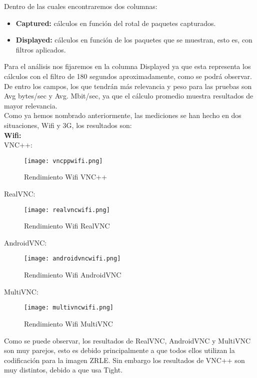 Dentro de las cuales encontraremos dos columnas:
\begin{itemize}
\item \textbf{Captured:} cálculos en función del rotal de paquetes capturados.
\item \textbf{Displayed:} cálculos en función de los paquetes que se muestran, esto es, con filtros aplicados.
\end{itemize}

Para el análisis nos fijaremos en la columna Displayed ya que esta representa los cálculos con el filtro de 180 segundos aproximadamente, como se podrá observar. De entro los campos, los que tendrán más relevancia y peso para las pruebas son Avg bytes/sec y Avg. Mbit/sec, ya que el cálculo promedio muestra resultados de mayor relevancia.\\
\newpage
Como ya hemos nombrado anteriormente, las mediciones se han hecho en dos situaciones, Wifi y 3G, los resultados son:\\

\textbf{Wifi:}\\

VNC++:
\begin{figure}[h]
\begin{flushleft}
\texttt{[image: vncppwifi.png]}
\end{flushleft}
\caption{Rendimiento Wifi VNC++}
\end{figure}

RealVNC:
\begin{figure}[h]
\begin{flushleft}
\texttt{[image: realvncwifi.png]}
\end{flushleft}
\caption{Rendimiento Wifi RealVNC}
\end{figure}

AndroidVNC:
\begin{figure}[h]
\begin{flushleft}
\texttt{[image: androidvncwifi.png]}
\end{flushleft}
\caption{Rendimiento Wifi AndroidVNC}
\end{figure}
\newpage
MultiVNC:
\begin{figure}[h]
\begin{flushleft}
\texttt{[image: multivncwifi.png]}
\end{flushleft}
\caption{Rendimiento Wifi MultiVNC}
\end{figure}

Como se puede observar, los resultados de RealVNC, AndroidVNC y MultiVNC son muy parejos, esto es debido principalmente a que todos ellos utilizan la codificación para la imagen ZRLE. Sin embargo los resultados de VNC++ son muy distintos, debido a que usa Tight.\\

